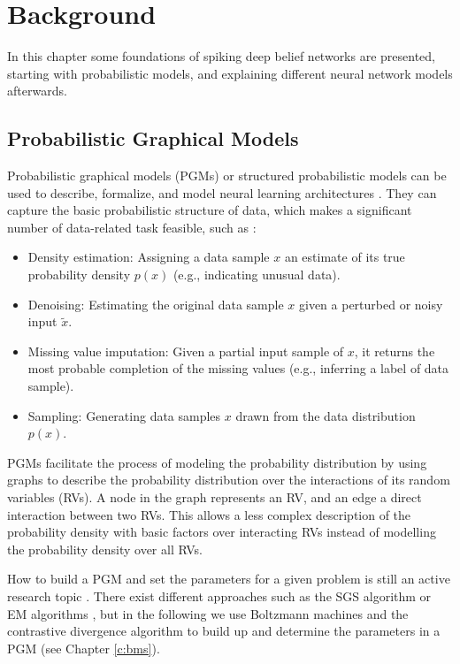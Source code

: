 \chapter{Background} \label{c:backgrnd}

In this chapter some foundations of spiking deep belief networks are presented, starting with probabilistic models, and explaining different neural network models afterwards.

\section{Probabilistic Graphical Models} \label{c:pgms}

Probabilistic graphical models (PGMs) or structured probabilistic models can be used to describe, formalize, and model neural learning architectures \cite{Goodfellow-et-al-2016-Book, Petrovici2016}.
They can capture the basic probabilistic structure of data, which makes a significant number of data-related task feasible, such as \cite{Goodfellow-et-al-2016-Book}:
\begin{itemize}

\item Density estimation: Assigning a data sample $x$ an estimate of its true probability density $p(x)$ (e.g., indicating unusual data).

\item Denoising: Estimating the original data sample $x$ given a perturbed or noisy input $\widetilde{x}$.  

\item Missing value imputation: Given a partial input sample of $x$, it returns the most probable completion of the missing values (e.g., inferring a label of data sample).

\item Sampling: Generating data samples $x$ drawn from the data distribution $p(x)$. 

\end{itemize}  

PGMs facilitate the process of modeling the probability distribution by using graphs to describe the probability distribution over the interactions of its random variables (RVs).
A node in the graph represents an RV, and an edge a direct interaction between two RVs.
This allows a less complex description of the probability density with basic factors over interacting RVs instead of modelling the probability density over all RVs. 

How to build a PGM and set the parameters for a given problem is still an active research topic \cite{Ghahramani2002, Zhou2007}.
There exist different approaches such as the SGS algorithm \cite{Zhou2007} or EM algorithms \cite{Ghahramani2002}, but in the following we use Boltzmann machines and the contrastive divergence algorithm to build up and determine the parameters in a PGM (see Chapter \ref{c:bms}).

